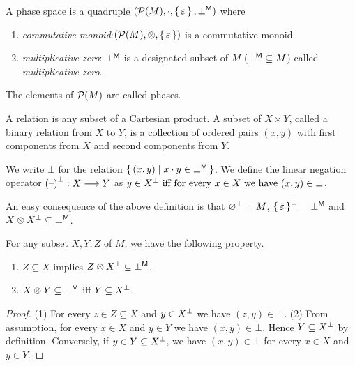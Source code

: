 
\begin{definition}
A phase space is a quadruple $(\mathcal{P}(M),\cdot,\set{\varepsilon},{\bot}^{\sf M})$ 
where
\begin{enumerate}
\item {\em commutative monoid}:$(\mathcal{P}(M),{\otimes},\set{\varepsilon}) $ 
is a commutative monoid.
\item {\em multiplicative zero}: ${{\bot}^{\sf M}}$ 
is a designated subset of $M$ ($ {\bot}^{\sf M} \subseteq M$) 
called {\it multiplicative zero}. 
\end{enumerate}
\end{definition}
The elements of $\mathcal{P}(M)$ are called phases. 

%
\begin{definition}[relation]
A relation is any subset of a Cartesian product.  A subset of  $X \times Y$, called a binary relation from $X$ to $Y$,
is a collection of ordered pairs $(x,y)$ with first components from $X$ and second components from $Y$.
\end{definition}
\begin{definition}
We write $\bot$ for the relation  $\set{ (x,y) | x \cdot y \in {\bot}^{\sf M}}$.
We define the linear negation operator  ${{{(\mbox{\textendash})}}^{\bot}} : X \longrightarrow Y$ as  $y \in {{X}^{\bot}}  \mbox{ iff for every }  x \in X \mbox{  we have  }  (x,y) \in \bot $.
\end{definition}
%
%
%
An easy consequence of the above definition is that 
${{\varnothing}^{\bot}} = M$,
${{\set{\varepsilon}}^{\bot}} = {\bot}^{\sf M}$
  and $X \otimes {{X}^{\bot}} \subseteq {\bot}^{\sf M}$. 
%
\begin{proposition} For any subset $X,Y,Z$ of $M$, we have the following property. 
\begin{enumerate}
\item $Z \subseteq X$  implies  $Z \otimes {{X}^{\bot}} \subseteq {\bot}^{\sf M}$. 
\item $X \otimes Y \subseteq {\bot}^{\sf M}$  iff $Y \subseteq {{X}^{\bot}}$.
\end{enumerate}
\end{proposition}
\begin{proof}
(1) For every $z \in Z \subseteq X$ and $y \in {{X}^{\bot}}$ we have $(z,y) \in \bot$. 
(2) From assumption, for every $x \in X$  and $y \in Y$  we have $(x,y) \in \bot$. Hence $Y \subseteq {{X}^{\bot}}$ by definition. Conversely, if $ y \in Y \subseteq {{X}^{\bot}}$, we have $(x,y) \in \bot$ for every $x \in X$ and $y \in Y$. 
\end{proof}
